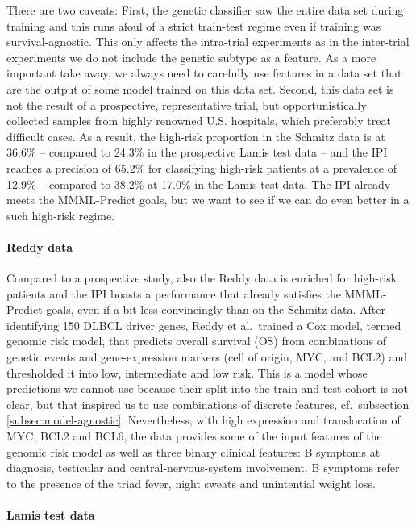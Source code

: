There are two caveats: First, the genetic classifier saw the entire data set during training and 
this runs afoul of a strict train-test regime even if training was 
survival-agnostic. This only affects the intra-trial experiments as in the inter-trial experiments 
we do not include the genetic subtype as a feature. As a more important take away, we always need 
to carefully use features in a data set that are the output of some model trained on this data set. 
Second, this data set is not the result of a 
prospective, representative trial, but opportunistically collected samples from highly renowned 
U.S. hospitals, which preferably treat 
difficult cases. As a result, the high-risk proportion in the Schmitz data is at \num{36.6}\% -- 
compared to \num{24.3}\% in the prospective Lamis test data -- and the IPI reaches a precision of 
\num{65.2}\% for classifying high-risk patients at a prevalence of \num{12.9}\% -- compared to 
\num{38.2}\% at \num{17.0}\% in the Lamis test data. The IPI already meets the MMML-Predict goals, 
but we want to see if we can do even better in a such high-risk regime.

\paragraph{Reddy data}

Compared to a prospective study, also the Reddy data is enriched for high-risk patients and the 
IPI boasts a performance that already satisfies the MMML-Predict goals, even if a bit less 
convincingly than on the Schmitz data. After identifying \num{150} DLBCL driver genes, Reddy et al.\ 
trained a Cox model, termed genomic risk model,
that predicts overall survival (OS) from combinations of genetic events and gene-expression markers 
(cell of origin, MYC, and BCL2) and thresholded it into low, intermediate and low risk. This is a
model whose predictions we cannot use because their split into the train and test cohort is not 
clear, but that inspired us to use combinations of discrete features, cf.\ subsection 
\ref{subsec:model-agnostic}. Nevertheless, with high expression and translocation of MYC, BCL2 and 
BCL6, the data provides some of the input features of the genomic risk model as well as three binary 
clinical features: B symptoms at diagnosis, testicular and central-nervous-system involvement. B 
symptoms refer to the presence of the triad fever, night sweats and unintential weight 
loss.

\paragraph{Lamis test data}

